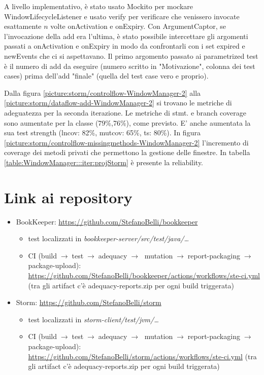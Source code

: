 \documentclass[10pt, a4paper]{article}
\newcommand{\gettablelabel}[5]{table:#1:#2:#3:iter#4:proj#5}
\newcommand{\getreltablelabel}[2]{\gettablelabel{#1}{}{}{}{#2}}
\newcommand{\getpicturelabel}[1]{picture:#1}
\def\storm{Storm}
\begin{document}
	A livello implementativo, è stato usato Mockito per mockare WindowLifecycleListener e usato verify per 
	verificare che venissero invocate esattamente $n$ volte onActivation e onExpiry. Con ArgumentCaptor, 
	se l'invocazione della add era l'ultima, è stato possibile intercettare gli argomenti passati a onActivation e
	onExpiry in modo da confrontarli con i set expired e newEvents che ci si aspettavano.
	Il primo argomento passato ai parametrized test è il numero di add da eseguire 
	(numero scritto in "Motivazione", colonna dei test cases) prima dell'add "finale" 
	(quella del test case vero e proprio).
	
	Dalla figura \ref{\getpicturelabel{storm/controlflow-WindowManager-2}} alla 
	\ref{\getpicturelabel{storm/dataflow-add-WindowManager-2}} 
	si trovano le metriche di adeguatezza per la seconda iterazione. Le metriche di stmt. e
	branch coverage sono aumentate per la classe (79\%,76\%), come previsto. 
	E' anche aumentata la sua test 
	strength (lncov: 82\%, mutcov: 65\%, ts: 80\%). In figura 
	\ref{\getpicturelabel{storm/controlflow-missingmethods-WindowManager-2}} 
	l'incremento di coverage dei metodi privati che permettono la gestione delle finestre.
	In tabella \ref{\getreltablelabel{WindowManager}{\storm}} è presente la reliability.
	
	\newpage
	\section{Link ai repository}
	\begin{itemize}
		\item BookKeeper: \url{https://github.com/StefanoBelli/bookkeeper}
		\begin{itemize}
			\item test localizzati in \textit{bookkeeper-server/src/test/java/\dots}
			\item CI (build$\;\rightarrow\;$test$\;\rightarrow\;$adequacy$\;\rightarrow\;$
			mutation$\;\rightarrow\;$report-packaging$\;\rightarrow\;$package-upload): 
			\url{https://github.com/StefanoBelli/bookkeeper/actions/workflows/ste-ci.yml} 
			(tra gli artifact c'è adequacy-reports.zip per ogni build triggerata)
		\end{itemize}
		\item Storm: \url{https://github.com/StefanoBelli/storm}
		\begin{itemize}
			\item test localizzati in \textit{storm-client/test/jvm/\dots}
			\item CI (build$\;\rightarrow\;$test$\;\rightarrow\;$adequacy$\;\rightarrow\;$
			mutation$\;\rightarrow\;$report-packaging$\;\rightarrow\;$package-upload): 
			\url{https://github.com/StefanoBelli/storm/actions/workflows/ste-ci.yml}
			(tra gli artifact c'è adequacy-reports.zip per ogni build triggerata)
		\end{itemize}
	\end{itemize}
	
\end{document}

